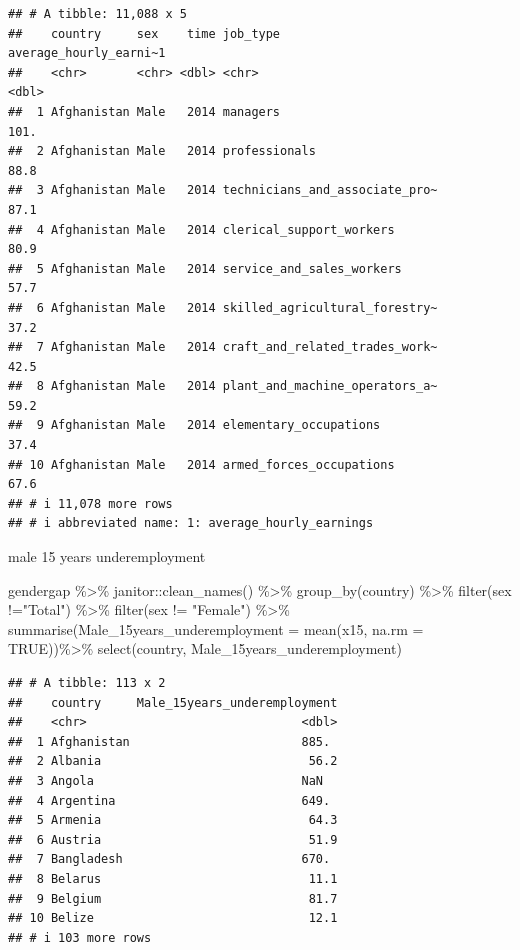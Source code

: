 \documentclass[
]{article}
\newenvironment{Shaded}{\begin{snugshade}}{\end{snugshade}}
\newcommand{\AttributeTok}[1]{\textcolor[rgb]{0.77,0.63,0.00}{#1}}
\newcommand{\ConstantTok}[1]{\textcolor[rgb]{0.00,0.00,0.00}{#1}}
\newcommand{\FunctionTok}[1]{\textcolor[rgb]{0.00,0.00,0.00}{#1}}
\newcommand{\NormalTok}[1]{#1}
\newcommand{\SpecialCharTok}[1]{\textcolor[rgb]{0.00,0.00,0.00}{#1}}
\newcommand{\StringTok}[1]{\textcolor[rgb]{0.31,0.60,0.02}{#1}}
\begin{document}
\begin{verbatim}
## # A tibble: 11,088 x 5
##    country     sex    time job_type                       average_hourly_earni~1
##    <chr>       <chr> <dbl> <chr>                                           <dbl>
##  1 Afghanistan Male   2014 managers                                        101. 
##  2 Afghanistan Male   2014 professionals                                    88.8
##  3 Afghanistan Male   2014 technicians_and_associate_pro~                   87.1
##  4 Afghanistan Male   2014 clerical_support_workers                         80.9
##  5 Afghanistan Male   2014 service_and_sales_workers                        57.7
##  6 Afghanistan Male   2014 skilled_agricultural_forestry~                   37.2
##  7 Afghanistan Male   2014 craft_and_related_trades_work~                   42.5
##  8 Afghanistan Male   2014 plant_and_machine_operators_a~                   59.2
##  9 Afghanistan Male   2014 elementary_occupations                           37.4
## 10 Afghanistan Male   2014 armed_forces_occupations                         67.6
## # i 11,078 more rows
## # i abbreviated name: 1: average_hourly_earnings
\end{verbatim}

male 15 years underemployment

\begin{Shaded}
\begin{Highlighting}[]
\NormalTok{gendergap }\SpecialCharTok{\%\textgreater{}\%}
\NormalTok{  janitor}\SpecialCharTok{::}\FunctionTok{clean\_names}\NormalTok{() }\SpecialCharTok{\%\textgreater{}\%}
  \FunctionTok{group\_by}\NormalTok{(country) }\SpecialCharTok{\%\textgreater{}\%}
  \FunctionTok{filter}\NormalTok{(sex }\SpecialCharTok{!=}\StringTok{"Total"}\NormalTok{) }\SpecialCharTok{\%\textgreater{}\%}
  \FunctionTok{filter}\NormalTok{(sex }\SpecialCharTok{!=} \StringTok{"Female"}\NormalTok{) }\SpecialCharTok{\%\textgreater{}\%}
  \FunctionTok{summarise}\NormalTok{(}\AttributeTok{Male\_15years\_underemployment =} \FunctionTok{mean}\NormalTok{(x15, }\AttributeTok{na.rm =} \ConstantTok{TRUE}\NormalTok{))}\SpecialCharTok{\%\textgreater{}\%}
  \FunctionTok{select}\NormalTok{(country, Male\_15years\_underemployment)}
\end{Highlighting}
\end{Shaded}

\begin{verbatim}
## # A tibble: 113 x 2
##    country     Male_15years_underemployment
##    <chr>                              <dbl>
##  1 Afghanistan                        885. 
##  2 Albania                             56.2
##  3 Angola                             NaN  
##  4 Argentina                          649. 
##  5 Armenia                             64.3
##  6 Austria                             51.9
##  7 Bangladesh                         670. 
##  8 Belarus                             11.1
##  9 Belgium                             81.7
## 10 Belize                              12.1
## # i 103 more rows
\end{verbatim}
\end{document}
